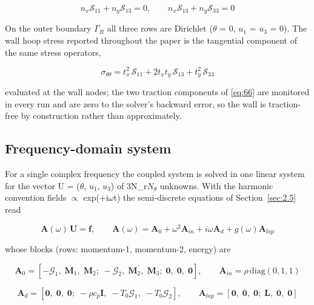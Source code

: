 \documentclass[preprint,12pt]{elsarticle}
\begin{document}
\begin{equation}
n_x\mathcal{S}_{11}+n_y\mathcal{S}_{13}=0,\qquad n_x\mathcal{S}_{13}+n_y\mathcal{S}_{33}=0 
\label{eq:66}
\end{equation}

On the outer boundary $\Gamma_{R}$ all three rows are Dirichlet ($\theta$ = 0, $u_{1}$ = $u_{3}$ = 0). The wall hoop stress reported throughout the paper is the tangential component of the same stress operators,

\begin{equation}
\sigma_{\theta\theta}=t_x^2\,\mathcal{S}_{11}+2t_xt_y\,\mathcal{S}_{13}+t_y^2\,\mathcal{S}_{33} 
\label{eq:67}
\end{equation}

evaluated at the wall nodes; the two traction components of \eqref{eq:66} are monitored in every run and are zero to the solver's backward error, so the wall is traction-free by construction rather than approximately.

\subsection{Frequency-domain system}
\label{sec:4.5}

For a single complex frequency the coupled system is solved in one linear system for the vector U = ($\theta$, $u_{1}$, $u_{3}$) of 3N\_{r}$N_{\theta}$ unknowns. With the harmonic convention fields $\propto$ exp(+i$\omega$t) the semi-discrete equations of Section~\ref{sec:2.5} read

\begin{equation}
\mathbf{A}(\omega)\,\mathbf{U}=\mathbf{f},\qquad \mathbf{A}(\omega)=\mathbf{A}_0+\omega^2\mathbf{A}_{in}+i\omega\mathbf{A}_d+g(\omega)\mathbf{A}_{lap} 
\label{eq:68}
\end{equation}

whose blocks (rows: momentum-1, momentum-2, energy) are

\begin{equation}
\mathbf{A}_0=\left[-\mathcal{G}_1,\;\mathbf{M}_1,\;\mathbf{M}_2;\;-\mathcal{G}_2,\;\mathbf{M}_2^{\prime},\;\mathbf{M}_3;\;\mathbf{0},\;\mathbf{0},\;\mathbf{0}\right],\qquad \mathbf{A}_{in}=\rho\,\mathrm{diag}(0,1,1) 
\label{eq:69}
\end{equation}

\begin{equation}
\mathbf{A}_d=\left[\mathbf{0},\;\mathbf{0},\;\mathbf{0};\;-\rho c_p\mathbf{I},\;-T_0\mathcal{G}_1,\;-T_0\mathcal{G}_2\right],\qquad \mathbf{A}_{lap}=\left[\mathbf{0},\;\mathbf{0},\;\mathbf{0};\;\mathbf{L},\;\mathbf{0},\;\mathbf{0}\right] 
\label{eq:70}
\end{equation}
\end{document}
